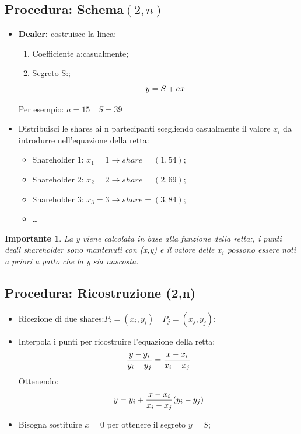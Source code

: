 \documentclass{book}
\newtheorem*{Importante}{\textbf{Importante}}
\begin{document}
\subsection{Procedura: Schema\((2,n)\)}
\begin{itemize}
    \item \textbf{Dealer:} costruisce la linea:
          \begin{enumerate}
              \item Coefficiente a:\@scelto casualmente;
              \item Segreto S:\@noto;
                    \begin{equation*}
                        \centering
                        y=S+ax
                    \end{equation*}
          \end{enumerate}
          Per esempio: \(a=15\quad S=39\)
    \item Distribuisci le shares ai n partecipanti scegliendo casualmente il valore \(x_{i}\) da introdurre nell'equazione della retta:
          \begin{itemize}
              \item Shareholder 1: \(x_{1}=1\rightarrow share=(1,54)\);
              \item Shareholder 2: \(x_{2}=2\rightarrow share=(2,69)\);
              \item Shareholder 3: \(x_{3}=3\rightarrow share=(3,84)\);
              \item \dots
          \end{itemize}
\end{itemize}
\begin{Importante}
    La y viene calcolata in base alla funzione della retta;\@tuttavia, i punti degli shareholder sono mantenuti con (x,y) e il valore delle \(x_{i}\) possono essere noti a priori a patto che la y sia nascosta\@.
\end{Importante}
\subsection{Procedura: Ricostruzione (2,n)}
\begin{itemize}
    \item Ricezione di due shares:\(P_{i}=(x_{i},y_{i})\quad P_{j}=(x_{j},y_{j})\);
    \item Interpola i punti per ricostruire l'equazione della retta:
          \begin{equation*}
              \centering
              \frac{y-y_{i}}{y_{i}-y_{j}}=\frac{x-x_{i}}{x_{i}-x_{j}}
          \end{equation*}
          Ottenendo:
          \begin{equation*}
              \centering
              y=y_{i}+\frac{x-x_{i}}{x_{i}-x_{j}}(y_{i}-y_{j})
          \end{equation*}
    \item Bisogna sostituire \(x=0\) per ottenere il segreto \(y=S\);
\end{itemize}
\end{document}
